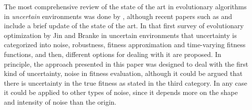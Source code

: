 \documentclass{llncs}
\begin{document}
\sloppypar The most comprehensive review of the state of the art in evolutionary
algorithms in {\em uncertain} environments 
was done by %
\cite{Jin2005303}, although recent
papers such as \cite{DBLP:journals/corr/QianYZ13,6931307} and \cite{Qian:sampling} include a brief update of the state
of the art. In that first survey 
of evolutionary optimization by Jin and Branke  in
uncertain environments that uncertainty is categorized into noise,
robustness, fitness approximation and time-varying fitness functions, and then,
different options for dealing with it are proposed. In principle, the
approach presented in this paper was designed to deal with the first kind of
uncertainty, noise in fitness evaluation, although it could be argued
that there is uncertainty in the true fitness as stated in the third
category. In any case it could be applied to
other types of noise, since it depends more on the shape and intensity
of noise than the origin. 
\end{document}
